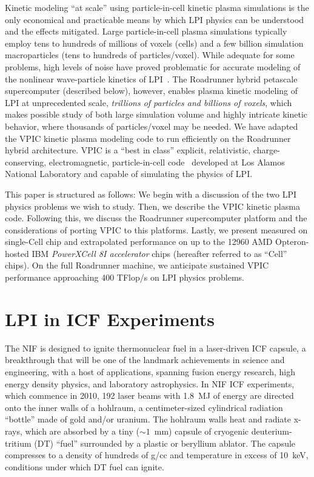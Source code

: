 \documentclass[10pt]{article}
\begin{document}
Kinetic modeling ``at scale'' using particle-in-cell kinetic plasma
simulations is the only economical and practicable means by which LPI
physics can be understood and the effects mitigated.
Large particle-in-cell plasma 
simulations typically employ tens to hundreds of millions of voxels
(cells) and a few billion simulation macroparticles (tens to hundreds
of particles/voxel).  While adequate for some problems, high levels of
noise have proved problematic for accurate modeling of the nonlinear
wave-particle kinetics of LPI~\cite{Yin_et_al_Phys_Plasmas_2006}.  The
Roadrunner hybrid petascale supercomputer (described below), however,
enables plasma kinetic modeling of LPI at unprecedented scale,
\textit{trillions of particles and billions of voxels}, which makes 
possible study of both large
simulation volume and highly intricate kinetic behavior, where
thousands of particles/voxel may be needed.  We have adapted the VPIC
kinetic plasma modeling code to run efficiently on the Roadrunner
hybrid architecture.  VPIC is a ``best in class'' explicit,
relativistic, charge-conserving, electromagnetic, particle-in-cell
code~\cite{Bowers_et_al_Phys_Plasmas_2007} developed at Los Alamos
National Laboratory and capable of simulating the physics of LPI.

This paper is structured as follows: We begin with a discussion of the
two LPI physics problems we wish to study.  Then, we describe the VPIC
kinetic plasma code.  Following this, we discuss the Roadrunner
supercomputer platform and the considerations of porting VPIC to this
platforms.  Lastly, we present measured on single-Cell chip and
extrapolated performance on up to the 12960 AMD Opteron-hosted IBM
\emph{PowerXCell 8I accelerator} chips (hereafter referred to as
``Cell'' chips).  On the full Roadrunner machine, we anticipate
sustained VPIC performance approaching 400 TFlop/s on LPI physics
problems.

\section{LPI in ICF Experiments}

The NIF is designed to ignite thermonuclear fuel in a laser-driven ICF
capsule, a breakthrough that will be one of the landmark achievements
in science and engineering, with a host of applications, spanning
fusion energy research, high energy density physics, and
laboratory astrophysics.  In NIF ICF experiments, which commence in
2010, 192 laser beams with 1.8~MJ of energy are directed onto the
inner walls of a hohlraum, a centimeter-sized cylindrical radiation
``bottle'' made of gold and/or uranium.  The hohlraum walls heat and
radiate x-rays, which are absorbed by a tiny ($\sim 1$~mm) capsule of
cryogenic deuterium-tritium (DT) ``fuel'' surrounded by a plastic or
beryllium ablator.  The capsule compresses to a density of hundreds of
g/cc and temperature in excess of 10~keV, conditions under which DT
fuel can ignite.
\end{document}
